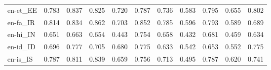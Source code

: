 \begin{tabular}{lllllllllll}
en-et\_EE & \cellcolor[HTML]{15904C}\textcolor[HTML]{FFFFFF}{0.783} & \cellcolor[HTML]{07753E}\textcolor[HTML]{FFFFFF}{0.837} & \cellcolor[HTML]{0A7B41}\textcolor[HTML]{FFFFFF}{0.825} & \cellcolor[HTML]{3FAA59}\textcolor[HTML]{000000}{0.720} & \cellcolor[HTML]{148E4B}\textcolor[HTML]{FFFFFF}{0.787} & \cellcolor[HTML]{33A456}\textcolor[HTML]{FFFFFF}{0.736} & \cellcolor[HTML]{A2D76A}\textcolor[HTML]{000000}{0.583} & \cellcolor[HTML]{128A49}\textcolor[HTML]{FFFFFF}{0.795} & \cellcolor[HTML]{73C264}\textcolor[HTML]{000000}{0.655} & \cellcolor[HTML]{108647}\textcolor[HTML]{FFFFFF}{0.802} \\
en-fa\_IR & \cellcolor[HTML]{0D8044}\textcolor[HTML]{FFFFFF}{0.814} & \cellcolor[HTML]{07753E}\textcolor[HTML]{FFFFFF}{0.834} & \cellcolor[HTML]{006837}\textcolor[HTML]{FFFFFF}{0.862} & \cellcolor[HTML]{4EB15D}\textcolor[HTML]{000000}{0.703} & \cellcolor[HTML]{036E3A}\textcolor[HTML]{FFFFFF}{0.852} & \cellcolor[HTML]{15904C}\textcolor[HTML]{FFFFFF}{0.785} & \cellcolor[HTML]{9BD469}\textcolor[HTML]{000000}{0.596} & \cellcolor[HTML]{128A49}\textcolor[HTML]{FFFFFF}{0.793} & \cellcolor[HTML]{9DD569}\textcolor[HTML]{000000}{0.589} & \cellcolor[HTML]{57B65F}\textcolor[HTML]{000000}{0.689} \\
en-hi\_IN & \cellcolor[HTML]{75C465}\textcolor[HTML]{000000}{0.651} & \cellcolor[HTML]{6EC064}\textcolor[HTML]{000000}{0.663} & \cellcolor[HTML]{73C264}\textcolor[HTML]{000000}{0.654} & \cellcolor[HTML]{E9F6A1}\textcolor[HTML]{000000}{0.443} & \cellcolor[HTML]{249D53}\textcolor[HTML]{FFFFFF}{0.754} & \cellcolor[HTML]{70C164}\textcolor[HTML]{000000}{0.658} & \cellcolor[HTML]{EEF8A8}\textcolor[HTML]{000000}{0.432} & \cellcolor[HTML]{60BA62}\textcolor[HTML]{000000}{0.681} & \cellcolor[HTML]{E3F399}\textcolor[HTML]{000000}{0.459} & \cellcolor[HTML]{7FC866}\textcolor[HTML]{000000}{0.634} \\
en-id\_ID & \cellcolor[HTML]{54B45F}\textcolor[HTML]{000000}{0.696} & \cellcolor[HTML]{17934E}\textcolor[HTML]{FFFFFF}{0.777} & \cellcolor[HTML]{4BB05C}\textcolor[HTML]{000000}{0.705} & \cellcolor[HTML]{60BA62}\textcolor[HTML]{000000}{0.680} & \cellcolor[HTML]{17934E}\textcolor[HTML]{FFFFFF}{0.775} & \cellcolor[HTML]{82C966}\textcolor[HTML]{000000}{0.633} & \cellcolor[HTML]{B9E176}\textcolor[HTML]{000000}{0.542} & \cellcolor[HTML]{73C264}\textcolor[HTML]{000000}{0.653} & \cellcolor[HTML]{B3DF72}\textcolor[HTML]{000000}{0.552} & \cellcolor[HTML]{17934E}\textcolor[HTML]{FFFFFF}{0.775} \\
en-is\_IS & \cellcolor[HTML]{148E4B}\textcolor[HTML]{FFFFFF}{0.787} & \cellcolor[HTML]{0E8245}\textcolor[HTML]{FFFFFF}{0.811} & \cellcolor[HTML]{06733D}\textcolor[HTML]{FFFFFF}{0.839} & \cellcolor[HTML]{70C164}\textcolor[HTML]{000000}{0.659} & \cellcolor[HTML]{249D53}\textcolor[HTML]{FFFFFF}{0.756} & \cellcolor[HTML]{45AD5B}\textcolor[HTML]{000000}{0.713} & \cellcolor[HTML]{D3EC87}\textcolor[HTML]{000000}{0.495} & \cellcolor[HTML]{148E4B}\textcolor[HTML]{FFFFFF}{0.787} & \cellcolor[HTML]{89CC67}\textcolor[HTML]{000000}{0.620} & \cellcolor[HTML]{30A356}\textcolor[HTML]{FFFFFF}{0.741} \\

\end{tabular}
